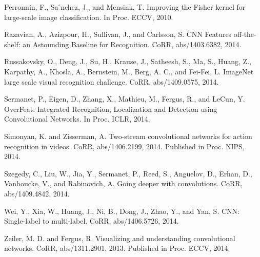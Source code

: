 \documentclass[12pt,a4paper,UTF8,twoside]{book}
\begin{document}
Perronnin, F., Sa ́nchez, J., and Mensink, T. Improving the Fisher kernel for large-scale image classification. In Proc. ECCV, 2010.

Razavian, A., Azizpour, H., Sullivan, J., and Carlsson, S. CNN Features off-the-shelf: an Astounding Baseline for Recognition. CoRR, abs/1403.6382, 2014.

Russakovsky, O., Deng, J., Su, H., Krause, J., Satheesh, S., Ma, S., Huang, Z., Karpathy, A., Khosla, A., Bernstein, M., Berg, A. C., and Fei-Fei, L. ImageNet large scale visual recognition challenge. CoRR, abs/1409.0575, 2014.

Sermanet, P., Eigen, D., Zhang, X., Mathieu, M., Fergus, R., and LeCun, Y. OverFeat: Integrated Recognition, Localization and Detection using Convolutional Networks. In Proc. ICLR, 2014.

Simonyan, K. and Zisserman, A. Two-stream convolutional networks for action recognition in videos. CoRR, abs/1406.2199, 2014. Published in Proc. NIPS, 2014.

Szegedy, C., Liu, W., Jia, Y., Sermanet, P., Reed, S., Anguelov, D., Erhan, D., Vanhoucke, V., and Rabinovich, A. Going deeper with convolutions. CoRR, abs/1409.4842, 2014.

Wei, Y., Xia, W., Huang, J., Ni, B., Dong, J., Zhao, Y., and Yan, S. CNN: Single-label to multi-label. CoRR, abs/1406.5726, 2014.

Zeiler, M. D. and Fergus, R. Visualizing and understanding convolutional networks. CoRR, abs/1311.2901, 2013. Published in Proc. ECCV, 2014.


\backmatter
\end{document}
